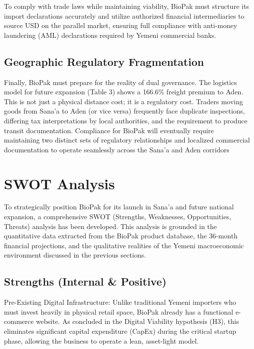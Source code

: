\documentclass[12pt,a4paper]{article}
\begin{document}
To comply with trade laws while maintaining viability, BioPak must structure its import declarations accurately and utilize authorized financial intermediaries to source USD on the parallel market, ensuring full compliance with anti-money laundering (AML) declarations required by Yemeni commercial banks.

\subsection{Geographic Regulatory Fragmentation}

Finally, BioPak must prepare for the reality of dual governance. The logistics model for future expansion (Table 3) shows a 166.6\% freight premium to Aden. This is not just a physical distance cost; it is a regulatory cost. Traders moving goods from Sana'a to Aden (or vice versa) frequently face duplicate inspections, differing tax interpretations by local authorities, and the requirement to produce transit documentation. Compliance for BioPak will eventually require maintaining two distinct sets of regulatory relationships and localized commercial documentation to operate seamlessly across the Sana'a and Aden corridors

\section{SWOT Analysis}

To strategically position BioPak for its launch in Sana'a and future national expansion, a comprehensive SWOT (Strengths, Weaknesses, Opportunities, Threats) analysis has been developed. This analysis is grounded in the quantitative data extracted from the BioPak product database, the 36-month financial projections, and the qualitative realities of the Yemeni macroeconomic environment discussed in the previous sections.

\subsection{Strengths (Internal \& Positive)}

Pre-Existing Digital Infrastructure: Unlike traditional Yemeni importers who must invest heavily in physical retail space, BioPak already has a functional e-commerce website. As concluded in the Digital Viability hypothesis (H3), this eliminates significant capital expenditure (CapEx) during the critical startup phase, allowing the business to operate a lean, asset-light model.
\end{document}
